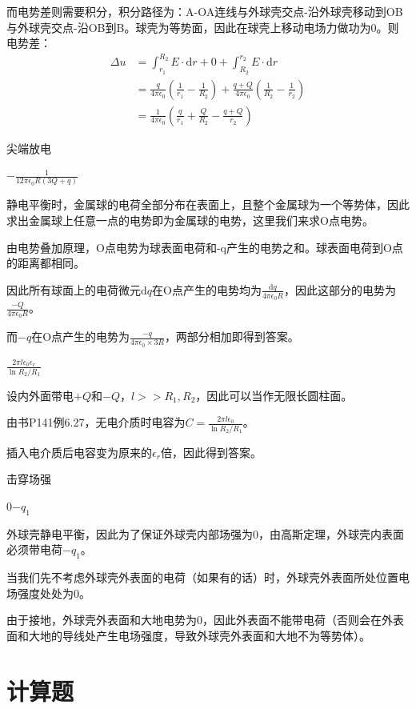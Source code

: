 \documentclass[b5paper,opensource,sourcefont,parskip]{qyxf-book}
\newcommand{\di}[1]{\mathrm{d}#1}
\begin{document}
而电势差则需要积分，积分路径为：A-OA连线与外球壳交点-沿外球壳移动到OB与外球壳交点-沿OB到B。球壳为等势面，因此在球壳上移动电场力做功为0。则电势差：
\begin{align*}
\Delta u&=\int_{r_1}^{R_2}E\cdot\di{r}+0+\int_{R_2}^{r_2}E\cdot\di{r}\\
&=\frac{q}{4\pi\epsilon_0}\left(\frac{1}{r_1}-\frac{1}{R_2}\right)+\frac{q+Q}{4\pi\epsilon_0}\left(\frac{1}{R_2}-\frac{1}{r_2}\right)\\
&=\frac{1}{4\pi\epsilon_0}\left(\frac{q}{r_1}+\frac{Q}{R_2}-\frac{q+Q}{r_2}\right)
\end{align*}

 尖端放电

 $ -\frac{1}{12\pi\epsilon_0 R(3Q+q)} $

\solve 静电平衡时，金属球的电荷全部分布在表面上，且整个金属球为一个等势体，因此求出金属球上任意一点的电势即为金属球的电势，这里我们来求O点电势。

由电势叠加原理，O点电势为球表面电荷和-q产生的电势之和。球表面电荷到O点的距离都相同。

因此所有球面上的电荷微元$\di{q}$在O点产生的电势均为$\frac{\di{q}}{4\pi\epsilon_0 R}$，因此这部分的电势为$\frac{-Q}{4\pi\epsilon_0 R}$。

而$ -q $在O点产生的电势为$\frac{-q}{4\pi\epsilon_0 \times 3R}$，两部分相加即得到答案。

 $\frac{2\pi l\epsilon_0\epsilon_r}{\ln R_2/R_1}$

\solve 设内外面带电$ +Q $和$ -Q $，$ l>>R_1,R_2 $，因此可以当作无限长圆柱面。

由书P141例6.27，无电介质时电容为$ C=\frac{2\pi l\epsilon_0}{\ln R_2/R_1} $。

插入电介质后电容变为原来的$ \epsilon_r $倍，因此得到答案。

 击穿场强

 $ 0 $\quad$ -q_1 $

\solve 外球壳静电平衡，因此为了保证外球壳内部场强为0，由高斯定理，外球壳内表面必须带电荷$ -q_1 $。

当我们先不考虑外球壳外表面的电荷（如果有的话）时，外球壳外表面所处位置电场强度处处为$0$。

由于接地，外球壳外表面和大地电势为0，因此外表面不能带电荷（否则会在外表面和大地的导线处产生电场强度，导致外球壳外表面和大地不为等势体）。

\section{计算题}
\end{document}

